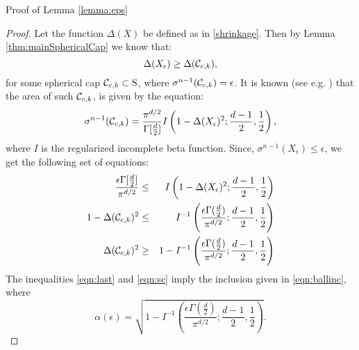 \begin{subsection}{Proof of Lemma \ref{lemma:eps}}

\begin{proof}Let the function $\Delta(X)$ be defined as in \eqref{shrinkage}. Then by Lemma \ref{thm:mainSphericalCap} we know that:
\begin{equation}\label{eqn:sc}\Delta(X_\epsilon) \geq \Delta(\mathcal{C}_{c, k}),
\end{equation}
for some spherical cap $\mathcal{C}_{c,k} \subset \text{S}$, where  $\sigma^{n-1}(\mathcal{C}_{c, k}) = \epsilon$. It is known (see e.g. \cite{sphericalCapRef}) that the area of such $\mathcal{C}_{c, k}$, is given by the equation:
\begin{equation}\sigma^{n-1}(\mathcal{C}_{c, k}) = \frac{\pi^{d/2}}{\Gamma[\frac{d}{2}]}I\left(1-\Delta(X_\epsilon)^2; \frac{d-1}{2}, \frac{1}{2}\right),
\end{equation}
where $I$ is the regularized incomplete beta function. Since, \mbox{$\sigma^{n-1}(X_\epsilon)\leq \epsilon$,} we get the following set of equations:
\begin{eqnarray}\nonumber \frac{\epsilon \Gamma[\frac{d}{2}]}{\pi^{d/2}} &\leq& I\left(1- \Delta(X_\epsilon)^2;\frac{d-1}{2}, \frac{1}{2}\right) \\
\nonumber 1- \Delta(\mathcal{C}_{c, k})^2 &\leq&  I^{-1}\left(\frac{\epsilon\Gamma(\frac{d}{2})}{\pi^{d/2}}; \frac{d-1}{2}, \frac{1}{2}\right) \\
\label{eqn:last}\Delta(\mathcal{C}_{c, k})^2 &\geq&  1- I^{-1}\left(\frac{\epsilon\Gamma(\frac{d}{2})}{\pi^{d/2}}; \frac{d-1}{2}, \frac{1}{2}\right)
\end{eqnarray}
The inequalities \eqref{eqn:last} and \eqref{eqn:sc} imply the inclusion given in \eqref{eqn:ballinc}, where \begin{equation}\label{eqn:alphaEpsilon}\alpha(\epsilon) = \sqrt{1- I^{-1}\left(\frac{\epsilon\Gamma(\frac{d}{2})}{\pi^{d/2}}; \frac{d-1}{2}, \frac{1}{2}\right)}.\end{equation}
\end{proof}
\end{subsection}

